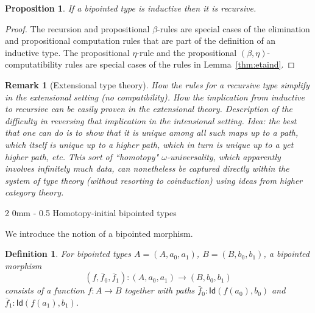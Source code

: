 \documentclass[reqno,10pt,a4paper,oneside]{amsart}
\makeatletter
\numberwithin{equation}{section}
\renewcommand{\subsection}{\@startsection
  {subsection}%
  {2}%
  {0mm}%
  {-\baselineskip}%
  {0.5\baselineskip}%
  {\normalfont\normalsize\bf}}%
\theoremstyle{mythm}
\newtheorem{proposition}[theorem]{Proposition}
\theoremstyle{mydef}
\newtheorem{definition}[theorem]{Definition}
\theoremstyle{myrmk}
\newtheorem{remark}[theorem]{Remark}
\newcommand{\co}{\colon}
\newcommand{\Id}{\mathsf{Id}}
\makeatother
\begin{document}
\begin{proposition} \label{thm:indrec}
If a bipointed type is inductive then it is recursive.
\end{proposition}


\begin{proof} The recursion and propositional $\beta$-rules are special cases of the elimination and propositional 
computation rules that are part of the definition of an inductive type. The propositional $\eta$-rule and the
propositional $(\beta, \eta)$-computatibility rules are special cases of the rules in Lemma~\ref{thm:etaind}. 
\end{proof}



\begin{remark}[Extensional type theory] How the rules for a recursive type simplify in the extensional setting (no compatibility). How
the implication from inductive to recursive can be easily proven in the extensional theory. Description of the difficulty in reversing that
implication in the intensional setting. Idea: the best that one can do is to show that it is unique among all such maps up to a path, which itself is unique up to a higher path, which in turn is unique up to a yet higher path, etc. This sort of ``homotopy" $\omega$-universality, which apparently involves infinitely much data, can nonetheless be captured directly within the system of type theory (without resorting to coinduction) using ideas from higher category theory. 
\end{remark}



\subsection{Homotopy-initial bipointed types}



We introduce the notion of a bipointed morphism.

\begin{definition} For bipointed types $A = (A, a_0, a_1)$, $B = (B, b_0, b_1)$, a \emph{bipointed morphism} 
\[
(f, \bar{f}_0, \bar{f}_1)  \co (A, a_0, a_1)  \to (B, b_0, b_1)
\] 
consists of a function $f \co A \to B$ together with paths $\bar{f}_0 \co \Id( f(a_0), b_0)$ and~$\bar{f}_1 \co \Id(f(a_1), b_1)$.
\end{definition}
\end{document}
